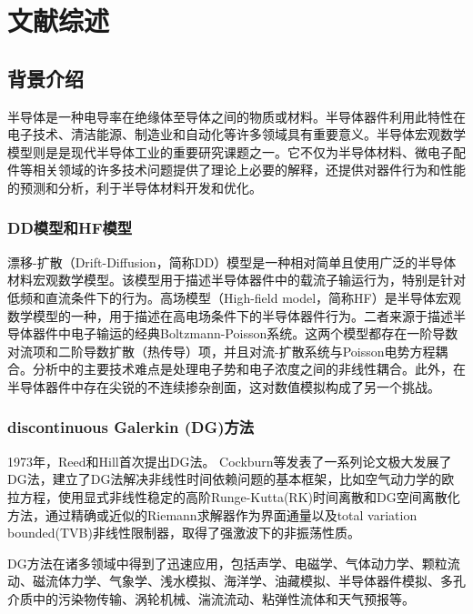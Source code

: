 \cleardoublepage
\newrefsection
\chapter{文献综述}

\section{背景介绍}
半导体是一种电导率在绝缘体至导体之间的物质或材料。半导体器件利用此特性在电子技术、清洁能源、制造业和自动化等许多领域具有重要意义。半导体宏观数学模型则是是现代半导体工业的重要研究课题之一。它不仅为半导体材料、微电子配件等相关领域的许多技术问题提供了理论上必要的解释，还提供对器件行为和性能的预测和分析，利于半导体材料开发和优化。
\subsection{DD模型\cite{cercignani2000device}和HF模型\cite{cercignani2000device}}
漂移-扩散（Drift-Diffusion，简称DD）模型是一种相对简单且使用广泛的半导体材料宏观数学模型。该模型用于描述半导体器件中的载流子输运行为，特别是针对低频和直流条件下的行为。高场模型（High-field model，简称HF）是半导体宏观数学模型的一种，用于描述在高电场条件下的半导体器件行为。二者来源于描述半导体器件中电子输运的经典Boltzmann-Poisson系统。这两个模型都存在一阶导数对流项和二阶导数扩散（热传导）项，并且对流-扩散系统与Poisson电势方程耦合\cite{cercignani2000device}。分析中的主要技术难点是处理电子势和电子浓度之间的非线性耦合。此外，在半导体器件中存在尖锐的不连续掺杂剖面，这对数值模拟构成了另一个挑战。

\subsection{discontinuous Galerkin (DG)方法}
1973年，Reed和Hill首次提出DG法\cite{reed1973triangular}。
Cockburn等发表了一系列论文极大发展了DG法，建立了DG法解决非线性时间依赖问题的基本框架\cite{reed1973triangular,cockburn1991runge,cockburn1989tvb2,cockburn1989tvb3,cockburn1990runge,cockburn1998runge}，比如空气动力学的欧拉方程，使用显式非线性稳定的高阶Runge-Kutta(RK)时间离散和DG空间离散化方法，通过精确或近似的Riemann求解器作为界面通量以及total variation bounded(TVB)非线性限制器，取得了强激波下的非振荡性质。

DG方法在诸多领域中得到了迅速应用，包括声学、电磁学、气体动力学、颗粒流动、磁流体力学、气象学、浅水模拟、海洋学、油藏模拟、半导体器件模拟、多孔介质中的污染物传输、涡轮机械、湍流流动、粘弹性流体和天气预报等\cite{cockburn2000development}。

